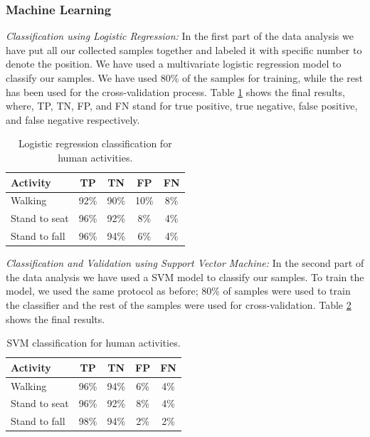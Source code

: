 \documentclass[letterpaper]{article}
\begin{document}
\begin{sloppy}
\subsubsection{Machine Learning\\}
\emph{Classification using Logistic Regression:}
In the first part of the data analysis we have put all our collected samples together and labeled it
with specific number to denote the position. We have used a multivariate logistic regression model to
classify our samples. We have used 80\% of the samples for training, while the rest has been used
for the cross-validation process. Table \ref{tab:human-logistic-class} shows the final results, where, TP, TN, 
FP, and FN stand for true positive, true negative, false positive, and false negative respectively. 

\begin{table}[!ht]
\caption{Logistic regression classification for human activities.}
	\label{tab:human-logistic-class}
	\centering
		\begin{tabular} {|l |c |c |c|c|}
			\hline
			{\bf Activity} & {\bf  TP}  &	{\bf TN}  &	{\bf FP} &	{\bf FN} \\ 
			\hline
			Walking	& 92\%	& 90\%	& 10\%	& 8\% \\ \hline
			Stand to seat	& 96\%	& 92\%	& 8\% & 	4\%	 \\ \hline 
			Stand to fall	& 96\%	& 94\%	& 6\%	& 4\%	 \\ \hline
		\end{tabular}
\end{table}

\noindent\emph{Classification and Validation using Support Vector Machine:}
In the second part of the data analysis we have used a SVM model
to classify our samples. To train the model, we used the same protocol as before; 80\% of
samples were used to train the classifier and the rest of the  samples were used for 
cross-validation. Table \ref{tab:human-svm-class} shows the final results.

\begin{table}[!ht]
\caption{SVM classification for human activities.}
	\label{tab:human-svm-class}
	\centering
		\begin{tabular} {|l |c |c |c|c|}
			\hline
			{\bf Activity} & {\bf  TP}  &	{\bf TN}  &	{\bf FP} &	{\bf FN} \\ 
			\hline
			Walking	& 96\%	& 94\%	& 6\%	& 4\% \\ \hline
			Stand to seat	& 96\%	& 92\%	& 8\% & 	4\%	 \\ \hline 
			Stand to fall	& 98\%	& 94\%	& 2\%	& 2\%	 \\ \hline
		\end{tabular}
\end{table}


\end{sloppy}
\end{document}
